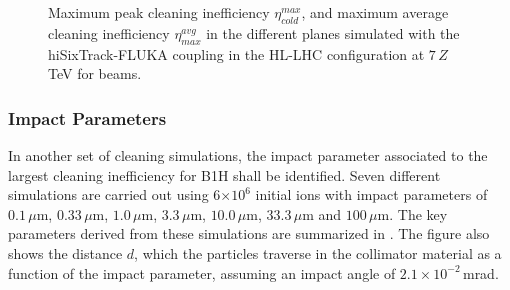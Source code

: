 \begin{figure}[htbp]
  \centering
  \caption{Maximum peak cleaning inefficiency $\eta_{cold}^{max}$, and maximum average cleaning inefficiency $\eta^{avg}_{max}$ in the different planes simulated with the hiSixTrack-FLUKA coupling in the HL-LHC configuration at $7\,Z\,$TeV for \lead beams. }  
  \label{pic:16080901}
  \end{figure}




\subsubsection{Impact Parameters}

In another set of cleaning simulations, the impact parameter associated to the largest cleaning inefficiency for B1H shall be identified. Seven different simulations are carried out using 6$\times 10^6$ initial \lead ions with impact parameters of $0.1\,\mu$m, $0.33\,\mu$m, $1.0\,\mu$m, $3.3\,\mu$m, $10.0\,\mu$m, $33.3\,\mu$m and $100\,\mu$m. The key parameters derived from these simulations are summarized in . The figure also shows the distance $d$, which the particles traverse in the collimator material as a function of the impact parameter, assuming an impact angle of $2.1\times 10^{-2}\,$mrad. 


